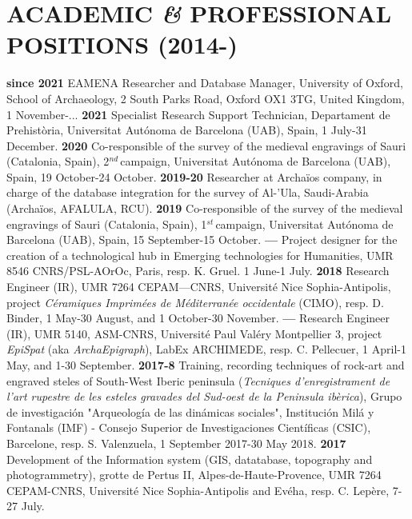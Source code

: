 \documentclass{article}
\begin{document}
\section{ACADEMIC \textit{\&} PROFESSIONAL POSITIONS (2014-)}

\textbf{since 2021 }EAMENA Researcher and Database Manager, University of Oxford, School of Archaeology, 2 South Parks Road, Oxford OX1 3TG, United Kingdom, 1 November-...
\smallbreak
\textbf{2021 }Specialist Research Support Technician, Departament de Prehist\`oria, Universitat Aut\'{o}noma de Barcelona (UAB), Spain, 1 July-31 December.
\smallbreak
\textbf{2020 }Co-responsible of the survey of the medieval engravings of Sauri (Catalonia, Spain), 2${}^{nd\ }$campaign, Universitat Aut\'{o}noma de Barcelona (UAB), Spain, 19 October-24 October.
\smallbreak
\textbf{2019-20 }Researcher at Archa\"{i}os company, in charge of the database integration for the survey of Al-'Ula, Saudi-Arabia (Archa\"{i}os, AFALULA, RCU).
\smallbreak
\textbf{2019 }Co-responsible of the survey of the medieval engravings of Sauri (Catalonia, Spain), 1${}^{st\ }$campaign, Universitat Aut\'{o}noma de Barcelona (UAB), Spain, 15 September-15 October.
\smallbreak
\textbf{--- }Project designer for the creation of a technological hub in Emerging technologies for Humanities, UMR 8546 CNRS/PSL-AOrOc, Paris, resp. K. Gruel. 1 June-1 July.
\smallbreak
\textbf{2018 }Research Engineer (IR), UMR 7264 CEPAM---CNRS, Universit\'{e} Nice Sophia-Antipolis, project \textit{C\'{e}ramiques Imprim\'{e}es de M\'{e}diterran\'{e}e occidentale} (CIMO), resp. D. Binder, 1 May-30 August, and 1 October-30 November.
\smallbreak
\textbf{--- }Research Engineer (IR), UMR 5140, ASM-CNRS, Universit\'{e} Paul Val\'{e}ry Montpellier 3, project \textit{EpiSpat} (aka \textit{ArchaEpigraph}), LabEx ARCHIMEDE, resp. C. Pellecuer, 1 April-1 May, and 1-30 September.
\smallbreak
\textbf{2017-8 }Training, recording techniques of rock-art and engraved steles of South-West Iberic peninsula (\textit{Tecniques d'enregistrament de l'art rupestre de les esteles gravades del Sud-oest de la Peninsula ibèrica}), Grupo de investigaci\'{o}n "Arqueolog\'{i}a de las din\'{a}micas sociales", Instituci\'{o}n Mil\'{a} y Fontanals (IMF) - Consejo Superior de Investigaciones Cient\'{i}ficas (CSIC), Barcelone, resp. S. Valenzuela, 1 September 2017-30 May 2018.
\smallbreak
\textbf{2017 }Development of the Information system (GIS, datatabase, topography and photogrammetry), grotte de Pertus II, Alpes-de-Haute-Provence, UMR 7264 CEPAM-CNRS, Universit\'{e} Nice Sophia-Antipolis and Ev\'{e}ha, resp. C. Lep\`{e}re, 7-27 July.
\end{document}

